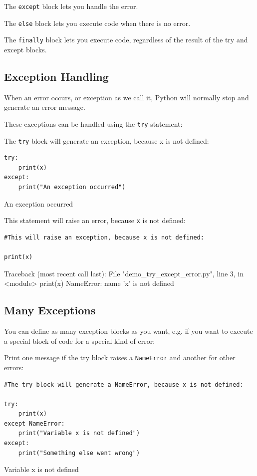 \documentclass[12pt,a4paper]{article}
\newcommand{\code}[1]{%
	\colorbox{backcolour}{\lstinline{#1}}%
}
\newcommand{\lcode}[1]{%
	\lstinline{#1}%
}
\begin{document}
The \code{except} block lets you handle the error.

The \code{else} block lets you execute code when there is no error.

The \code{finally} block lets you execute code, regardless of the result of the
try and except blocks.

\subsection{Exception Handling}

When an error occurs, or exception as we call it, Python will normally stop and
generate an error message.

These exceptions can be handled using the \code{try} statement:

\begin{ebox}
The \lcode{try} block will generate an exception, because x is not defined:
	\begin{lstlisting}
try:
    print(x)
except:
    print("An exception occurred")
	\end{lstlisting}
\tcblower
	\begin{vercode}
An exception occurred
	\end{vercode}
\end{ebox}

\begin{ebox}
This statement will raise an error, because \lcode{x} is not defined:
	\begin{lstlisting}
#This will raise an exception, because x is not defined:

print(x)
	\end{lstlisting}
\tcblower
	\begin{vercode}
Traceback (most recent call last):
  File "demo_try_except_error.py", line 3, in <module>
    print(x)
NameError: name 'x' is not defined
	\end{vercode}
\end{ebox}
\subsection{Many Exceptions}

You can define as many exception blocks as you want, e.g. if you want to
execute a special block of code for a special kind of error:

\begin{ebox}
Print one message if the try block raises a \lcode{NameError} and another for other errors:
	\begin{lstlisting}
#The try block will generate a NameError, because x is not defined:

try:
    print(x)
except NameError:
    print("Variable x is not defined")
except:
    print("Something else went wrong")
	\end{lstlisting}
\tcblower
	\begin{vercode}
Variable x is not defined 
	\end{vercode}
\end{ebox}
\end{document}
